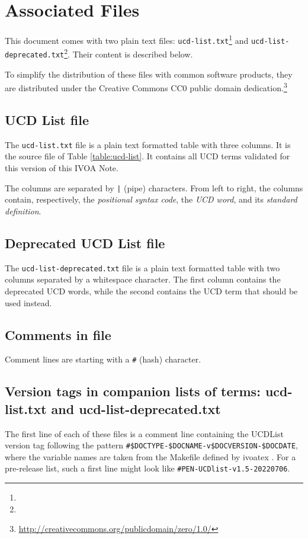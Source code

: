 \documentclass[11pt,a4paper]{ivoa}
\begin{document}
\section{Associated Files}
This document comes with two plain text files:
\texttt{ucd-list.txt}\footnote{} and 
\texttt{ucd-list-deprecated.txt}\footnote{}. 
Their content is described below. 

To simplify the distribution of these files with common software
products, they are distributed under the Creative Commons CC0 public
domain dedication.\footnote{\url{http://creativecommons.org/publicdomain/zero/1.0/}}

\subsection{UCD List file}
The \texttt{ucd-list.txt} file is a plain text formatted table with three columns.
It is the source file of Table \ref{table:ucd-list}. It contains all UCD terms validated 
for this version of this IVOA Note.

The columns are separated by \texttt{|} (pipe) characters. From left to right, the 
columns contain, respectively, the \emph{positional syntax code}, the \emph{UCD word}, and its
\emph{standard definition}. 

\subsection{Deprecated UCD List file}
The \texttt{ucd-list-deprecated.txt} file is a plain text formatted table with two
columns separated by a whitespace character. The first column contains the deprecated 
UCD words, while the second contains the UCD term that should be used instead.

\subsection{Comments in file}

Comment lines are starting with a \texttt{\#} (hash) character.

\subsection{Version tags in companion lists of terms: ucd-list.txt and ucd-list-deprecated.txt}

The first line of each of these files is a comment line containing the UCDList version 
tag following the pattern
\verb|#$DOCTYPE-$DOCNAME-v$DOCVERSION-$DOCDATE|, where the
variable names are taken from the Makefile defined by  ivoatex \citep{ivoatexDoc}.  For a
pre-release list, such a first line might look like
\verb|#PEN-UCDlist-v1.5-20220706|.
\end{document}
